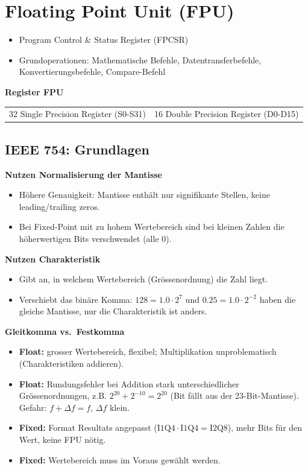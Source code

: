 \section{Floating Point Unit (FPU)}
\begin{itemize}
    \item Program Control \& Status Register (FPCSR)
    \item Grundoperationen: Mathematische Befehle, Datentransferbefehle, Konvertierungsbefehle, Compare-Befehl
\end{itemize}

\smallbreak
\textbf{Register FPU}

\begin{tabularx}{\columnwidth}{XX}
    32 Single Precision Register (S0-S31)&
    16 Double Precision Register (D0-D15)
\end{tabularx}

\subsection{IEEE 754: Grundlagen} 
\textbf{Nutzen Normalisierung der Mantisse}
\begin{itemize}
  \item Höhere Genauigkeit: Mantisse enthält nur signifikante Stellen, keine leading/trailing zeros.
  \item Bei Fixed-Point mit zu hohem Wertebereich sind bei kleinen Zahlen die höherwertigen Bits verschwendet (alle 0).
\end{itemize}
 
\textbf{Nutzen Charakteristik}
\begin{itemize}
  \item Gibt an, in welchem Wertebereich (Grössenordnung) die Zahl liegt.
  \item Verschiebt das binäre Komma: $128 = 1.0 \cdot 2^{7}$ und $0.25 = 1.0 \cdot 2^{-2}$ haben die gleiche Mantisse, nur die Charakteristik ist anders.
\end{itemize}
 
\textbf{Gleitkomma vs.\ Festkomma}
\begin{itemize}
  \item[+] \textbf{Float:} grosser Wertebereich, flexibel; Multiplikation unproblematisch (Charakteristiken addieren).
  \item[--] \textbf{Float:} Rundungsfehler bei Addition stark unterschiedlicher Grössenordnungen, 
  z.B. $2^{20} + 2^{-10} = 2^{20}$ (Bit fällt aus der 23-Bit-Mantisse). Gefahr: $f + \Delta f = f$, $\Delta f$ klein.
  \item[+] \textbf{Fixed:} Format Resultats angepasst ($\text{I1Q4} \cdot \text{I1Q4} = \text{I2Q8}$), mehr Bits für den Wert, keine FPU nötig.
  \item[--] \textbf{Fixed:} Wertebereich muss im Voraus gewählt werden.
\end{itemize}
 
